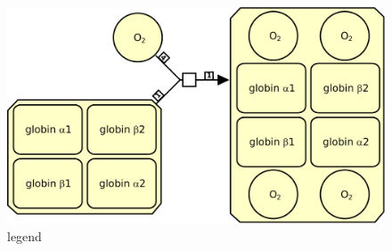 \begin{figure}[H]
  \centering
  \includegraphics[scale = 0.4]{images/hemoglobin-complex}
  \caption{legend}
  \label{fig:hemoglobin-complex}
\end{figure}

